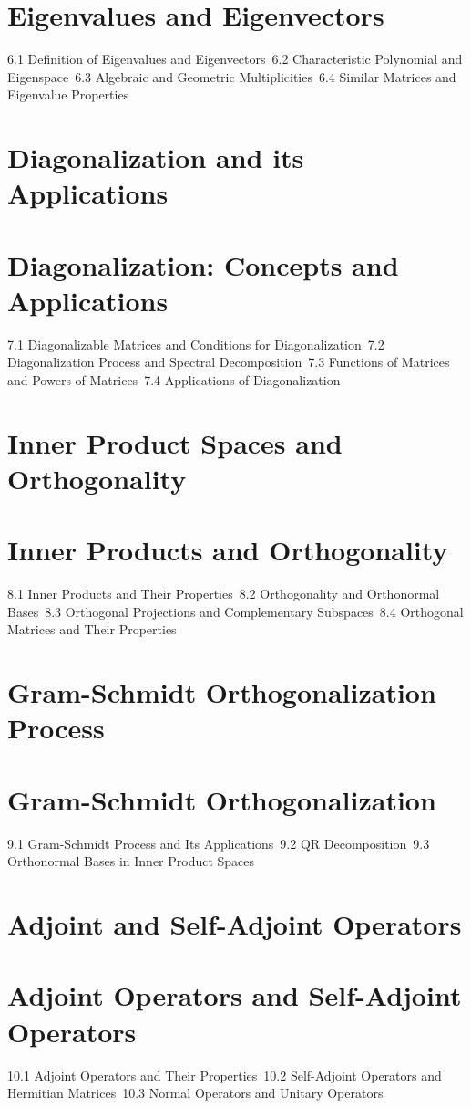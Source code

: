 \section{Eigenvalues and Eigenvectors}
6.1 Definition of Eigenvalues and Eigenvectors\
6.2 Characteristic Polynomial and Eigenspace\
6.3 Algebraic and Geometric Multiplicities\
6.4 Similar Matrices and Eigenvalue Properties\
\section{Diagonalization and its Applications}
\section{Diagonalization: Concepts and Applications}
7.1 Diagonalizable Matrices and Conditions for Diagonalization\
7.2 Diagonalization Process and Spectral Decomposition\
7.3 Functions of Matrices and Powers of Matrices\
7.4 Applications of Diagonalization\
\section{Inner Product Spaces and Orthogonality}
\section{Inner Products and Orthogonality}
8.1 Inner Products and Their Properties\
8.2 Orthogonality and Orthonormal Bases\
8.3 Orthogonal Projections and Complementary Subspaces\
8.4 Orthogonal Matrices and Their Properties\
\section{Gram-Schmidt Orthogonalization Process}
\section{Gram-Schmidt Orthogonalization}
9.1 Gram-Schmidt Process and Its Applications\
9.2 QR Decomposition\
9.3 Orthonormal Bases in Inner Product Spaces\
\section{Adjoint and Self-Adjoint Operators}
\section{Adjoint Operators and Self-Adjoint Operators}
10.1 Adjoint Operators and Their Properties\
10.2 Self-Adjoint Operators and Hermitian Matrices\
10.3 Normal Operators and Unitary Operators\
